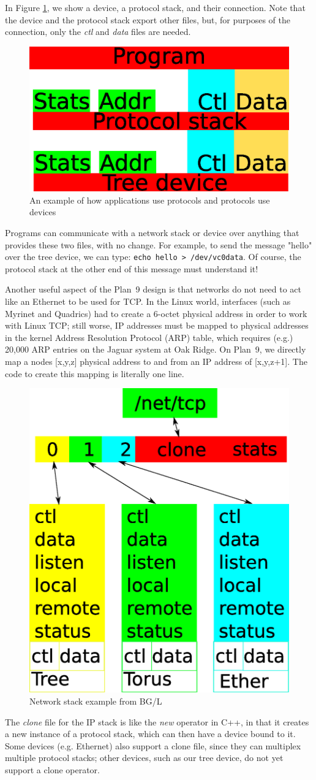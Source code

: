 \documentclass[letterpaper,twocolumn,10pt]{article}
\begin{document}
In Figure \ref{net}, we show a device, a protocol stack, and their connection. Note that the device and the protocol stack export other files, but, for purposes of the connection, only the \textit{ctl} and \textit{data} files are needed. 
\begin{figure}
\includegraphics[width=.3\textwidth]{netdev.eps} 
\caption{\label{net}An example of how applications use protocols and protocols use devices}
\end{figure}
Programs can communicate with a network stack or device over anything that provides these two files, with no change. For example, to send the message "hello" over the tree device, we can type: \texttt{echo hello > /dev/vc0data}. Of course, the protocol stack at the other end of this message must understand it!

Another useful aspect of the Plan~9 design is that networks do not need to act like an Ethernet to be used for TCP. In the Linux world, interfaces (such as Myrinet and Quadrics) had to create a 6-octet physical address in order to work with Linux TCP; still worse, IP addresses must be mapped to physical addresses in the kernel Address Resolution Protocol (ARP) table, which requires (e.g.) 20,000 ARP entries on the Jaguar system at Oak Ridge. On Plan~9, we directly map a nodes [x,y,z] physical address to and from  an IP address of [x,y,z+1]. The code to create this mapping is literally one line. 
\begin{figure}
\includegraphics[width=.3\textwidth]{netstack.eps} 
\caption{\label{netstack}Network stack example from BG/L}
\end{figure}

The \textit{clone} file for the IP stack is like the \textit{new} operator in C++, in that it creates a new instance of a protocol stack, which can then have a device bound to it. Some devices (e.g. Ethernet) also support a clone file, since they can multiplex multiple protocol stacks; other devices, such as our tree device, do not yet support a clone operator. 
\end{document}
